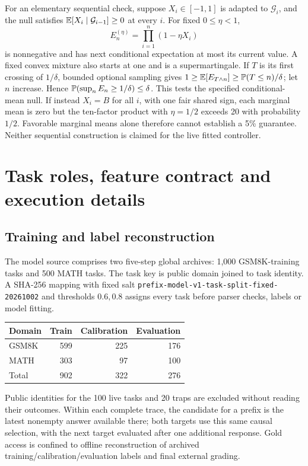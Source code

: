 For an elementary sequential check, suppose \(X_i\in[-1,1]\) is adapted to
\(\mathcal G_i\), and the null satisfies
\(\mathbb E[X_i\mid\mathcal G_{i-1}]\ge0\) at every \(i\).
For fixed \(0\le\eta<1\),
\[
 E_n^{(\eta)}=\prod_{i=1}^n(1-\eta X_i)
\]
is nonnegative and has next conditional expectation at most its current
value. A fixed convex mixture also starts at one and is a supermartingale.
If \(T\) is its first crossing of \(1/\delta\), bounded optional sampling
gives \(1\ge\mathbb E[E_{T\wedge n}]\ge\mathbb P(T\le n)/\delta\); let \(n\) increase.
Hence \(\mathbb P(\sup_n E_n\ge1/\delta)\le\delta\).
This tests the specified conditional-mean null. If instead \(X_i=B\) for all
\(i\), with one fair shared sign, each marginal mean is zero but the ten-factor
product with \(\eta=1/2\) exceeds 20 with probability \(1/2\).
Favorable marginal means alone therefore cannot establish a 5\% guarantee.
Neither sequential construction is claimed for the live fitted controller.

\section{Task roles, feature contract and execution details}
\label{app:protocol}
\subsection{Training and label reconstruction}
The model source comprises two five-step global archives: 1,000 GSM8K-training
tasks and 500 MATH tasks. The task key is public domain joined to task identity.
A SHA-256 mapping with fixed salt
\texttt{prefix-model-v1-task-split-fixed-20261002} and thresholds \(0.6,0.8\)
assigns every task before parser checks, labels or model fitting.
\begin{center}
\begin{tabular}{lrrr}
\toprule
Domain & Train & Calibration & Evaluation\\
\midrule
GSM8K & 599 & 225 & 176\\
MATH & 303 & 97 & 100\\
Total & 902 & 322 & 276\\
\bottomrule
\end{tabular}
\end{center}
Public identities for the 100 live tasks and 20 traps are excluded without
reading their outcomes. Within each complete trace, the candidate for a
prefix is the latest nonempty answer available there; both targets use this
same causal selection, with the next target evaluated after one additional
response. Gold access is confined to offline reconstruction of archived
training/calibration/evaluation labels and final external grading.

